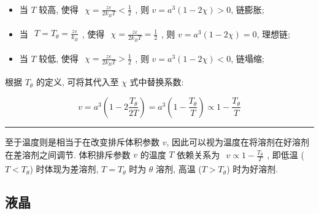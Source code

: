 \documentclass[../../main.tex]{subfiles}
\begin{document}
\begin{enumerate}
{{\begin{itemize}
    \item 当 $T$ 较高, 使得 $\begin{aligned}\chi = \frac{z\varepsilon}{2k_{B}T}<\frac{1}{2}\end{aligned}$, 则 $v = a^{3}(1-2\chi)>0$, 链膨胀;
    \item 当 $\begin{aligned}T = T_{\theta} = \frac{z\varepsilon}{k_{B}}\end{aligned}$, 使得 $\begin{aligned}\chi = \frac{z\varepsilon}{2k_{B}T} = \frac{1}{2}\end{aligned}$, 则 $v = a^{3}(1-2\chi)=0$, 理想链;
    \item 当 $T$ 较低, 使得 $\begin{aligned}\chi = \frac{z\varepsilon}{2k_{B}T}>\frac{1}{2}\end{aligned}$, 则 $v = a^{3}(1-2\chi)<0$, 链塌缩;
\end{itemize}

根据 $T_{\theta}$ 的定义, 可将其代入至 $\chi$ 式中替换系数: 

$$
v = a^{3} \left(1 - 2 \frac{T_{\theta}}{2T}\right) = a^{3} \left(1 - \frac{T_{\theta}}{T}\right)\propto \boxed{1 - \frac{T_{\theta}}{T}}
$$

\begin{center}
\rule{0.8\textwidth}{0.4pt}
\end{center}}}

至于温度则是相当于在改变排斥体积参数 $v$, 因此可以视为温度在将溶剂在好溶剂在差溶剂之间调节. 体积排斥参数 $v$ 的温度 $T$ 依赖关系为 $\begin{aligned}v\propto 1 - \frac{T_{\theta}}{T}\end{aligned}$, 即低温 ($T < T_{\theta}$) 时体现为差溶剂, $T = T_{\theta}$ 时为 $\theta$ 溶剂, 高温 ($T > T_{\theta}$) 时为好溶剂.


\end{enumerate}

\subsection{液晶}
\end{document}
